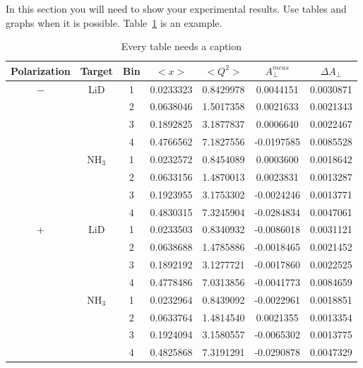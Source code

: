 \documentclass[letterpaper,12pt]{article}
\begin{document}
In this section you will need to show your experimental results. Use tables and
graphs when it is possible. Table~\ref{tbl:bins} is an example.

\begin{table}[ht]
\begin{center}
\caption{Every table needs a caption}
\label{tbl:bins} %
\begin{tabular}{|ccccccc|} \hline
\multicolumn{1}{|c}{Polarization} & \multicolumn{1}{c}{Target} &
\multicolumn{1}{c}{Bin} & \multicolumn{1}{c}{$<x>$} &
\multicolumn{1}{c}{$<Q^2>$} & \multicolumn{1}{c}{$A_{\perp}^{meas}$} &
\multicolumn{1}{c|}{$\Delta A_{\perp}$} \\
\hline
$-$ & LiD     & 1 &   0.0233323 &   0.8429978  &   0.0044151 &   0.0030871 \\
    &         & 2 &   0.0638046 &   1.5017358  &   0.0021633 &   0.0021343 \\
    &         & 3 &   0.1892825 &   3.1877837  &   0.0006640 &   0.0022467 \\
    &         & 4 &   0.4766562 &   7.1827556  &  -0.0197585 &   0.0085528 \\
    & NH$_3$  & 1 &   0.0232572 &   0.8454089  &   0.0003600 &   0.0018642 \\
    &         & 2 &   0.0633156 &   1.4870013  &   0.0023831 &   0.0013287 \\
    &         & 3 &   0.1923955 &   3.1753302  &  -0.0024246 &   0.0013771 \\
    &         & 4 &   0.4830315 &   7.3245904  &  -0.0284834 &   0.0047061 \\
$+$ & LiD     & 1 &   0.0233503 &   0.8340932  &  -0.0086018 &   0.0031121 \\
    &         & 2 &   0.0638688 &   1.4785886  &  -0.0018465 &   0.0021452 \\
    &         & 3 &   0.1892192 &   3.1277721  &  -0.0017860 &   0.0022525 \\
    &         & 4 &   0.4778486 &   7.0313856  &  -0.0041773 &   0.0084659 \\
    & NH$_3$  & 1 &   0.0232964 &   0.8439092  &  -0.0022961 &   0.0018851 \\
    &         & 2 &   0.0633764 &   1.4814540  &   0.0021355 &   0.0013354 \\
    &         & 3 &   0.1924094 &   3.1580557  &  -0.0065302 &   0.0013775 \\
    &         & 4 &   0.4825868 &   7.3191291  &  -0.0290878 &   0.0047329 \\
\hline
\end{tabular}
\end{center}
\end{table}
\end{document}
